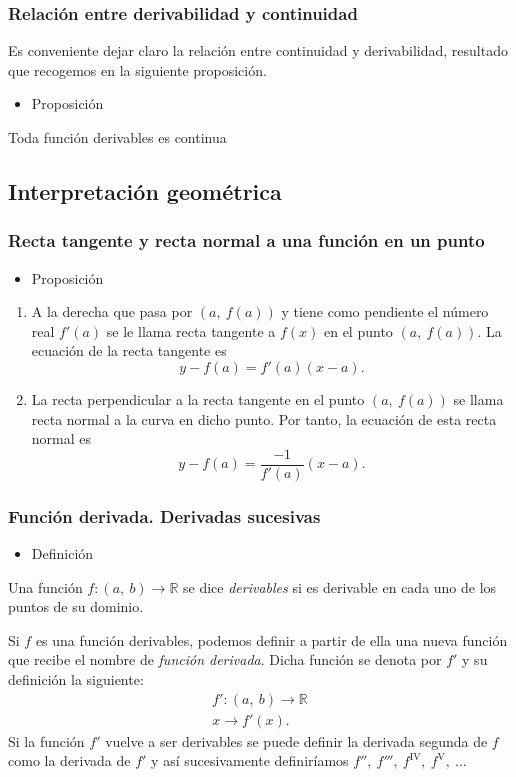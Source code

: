 \subsubsection{Relación entre derivabilidad y continuidad}
Es conveniente dejar claro la relación entre continuidad y derivabilidad, resultado que recogemos en la siguiente proposición.
\begin{itemize}[label=\color{red}\textbullet, leftmargin=*]
	\item \color{lightblue}Proposición
\end{itemize}
Toda función derivables es continua
\subsection{Interpretación geométrica}
\subsubsection{Recta tangente y recta normal a una función en un punto}
\begin{itemize}[label=\color{red}\textbullet, leftmargin=*]
	\item \color{lightblue}Proposición
\end{itemize}
\begin{enumerate}[label=\arabic*)]
	\item A la derecha que pasa por $(a,~f(a))$ y tiene como pendiente el número real $f'(a)$ se le llama recta tangente a $f(x)$ en el punto $(a,~f(a))$. La ecuación de la recta tangente es \[ y-f(a)=f'(a)(x-a).\]
	\item La recta perpendicular a la recta tangente en el punto $(a,~f(a))$ se llama recta normal a la curva en dicho punto. Por tanto, la ecuación de esta recta normal es \[ y-f(a)=\dfrac{-1}{f'(a)} (x-a).\]
\end{enumerate}
\subsubsection{Función derivada. Derivadas sucesivas}
\begin{itemize}[label=\color{red}\textbullet, leftmargin=*]
	\item \color{lightblue}Definición
\end{itemize}
Una función $f:(a,~b)\rightarrow\mathbb{R}$ se dice \textit{derivables} si es derivable en cada uno de los puntos de su dominio.

Si $f$ es una función derivables, podemos definir a partir de ella una nueva función que recibe el nombre de \textit{función derivada}. Dicha función se denota por $f'$ y su definición la siguiente: \[ \begin{array}{c}
	f':(a,~b)\rightarrow\mathbb{R}\\
	x\rightarrow f'(x).
\end{array} \]
Si la función $f'$ vuelve a ser derivables se puede definir la derivada segunda de $f$ como la derivada de $f'$ y así sucesivamente definiríamos $f'',~f''',~f^{\mathrm{IV}},~f^{\mathrm{V}},~\hdots$

